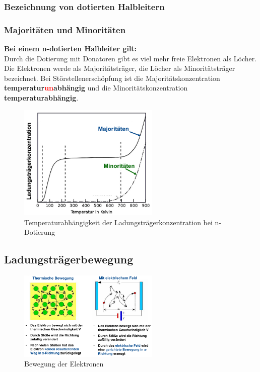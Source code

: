 	\subsubsection{Bezeichnung von dotierten Halbleitern}
	
	\subsubsection{Majoritäten und Minoritäten}
		\textbf{Bei einem n-dotierten Halbleiter gilt:}\\
		Durch die Dotierung mit Donatoren gibt es viel mehr freie Elektronen als Löcher.
		Die Elektronen werde als Majoritätsträger, die Löcher als Minoritätsträger bezeichnet.
		Bei Störstellenerschöpfung ist die Majoritätskonzentration \textbf{temperatur\textcolor{red}{un}abhängig} und die Minoritätskonzentration \textbf{temperaturabhängig}.
		
		\begin{figure}[h!]
			\centering
			\includegraphics[width=0.6\textwidth]{Kapitel/Kap04/ladungstrKonzN.png}
			\caption{Temperaturabhängigkeit der Ladungsträgerkonzentration bei n-Dotierung}
			\label{04_ladungstrKonzN}
		\end{figure}
		\newpage
		
\subsection{Ladungsträgerbewegung}
	\begin{figure}[h!]
		\centering
		\includegraphics[width=0.6\textwidth]{Kapitel/Kap04/bewegungElektronen.png}
		\caption{Bewegung der Elektronen}
		\label{04_BewElek}
	\end{figure}
	
